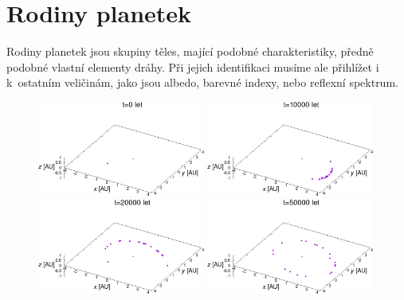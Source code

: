 \documentclass[A4paper, 12pt, oneside]{book}
\begin{document}
\pagebreak
\section{Rodiny planetek}

Rodiny planetek jsou skupiny těles, mající podobné charakteristiky, předně podobné vlastní elementy dráhy. Při jejich identifikaci musíme ale přihlížet i k~ostatním veličinám, jako jsou albedo, barevné indexy, nebo reflexní spektrum.

\immediate{}
\immediate{}
\immediate{}
\immediate{}
\begin{figure}
	\centering
	\includegraphics[width=0.49\textwidth]{obr/trajec_001t.png}
	\includegraphics[width=0.49\textwidth]{obr/trajec_101t.png} \\
	\includegraphics[width=0.49\textwidth]{obr/trajec_201t.png}
	\includegraphics[width=0.49\textwidth]{obr/trajec_501t.png}

\end{figure}
\end{document}
